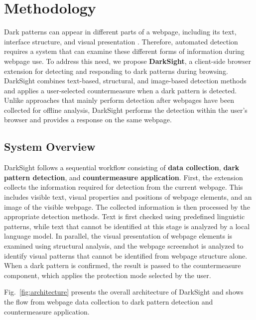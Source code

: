\documentclass[11pt,a4paper]{article}
\begin{document}
\setcounter{section}{2}
\section{Methodology}
\label{sec:methodology}

Dark patterns can appear in different parts of a webpage, including its text, interface structure, and visual presentation \cite{mathur2019, aidui2023, dpsentinel2024, gray2023}. Therefore, automated detection requires a system that can examine these different forms of information during webpage use. To address this need, we propose \textbf{DarkSight}, a client-side browser extension for detecting and responding to dark patterns during browsing. DarkSight combines text-based, structural, and image-based detection methods and applies a user-selected countermeasure when a dark pattern is detected. Unlike approaches that mainly perform detection after webpages have been collected for offline analysis, DarkSight performs the detection within the user's browser and provides a response on the same webpage.

\subsection{System Overview}
\label{subsec:system_overview}

DarkSight follows a sequential workflow consisting of \textbf{data collection}, \textbf{dark pattern detection}, and \textbf{countermeasure application}. First, the extension collects the information required for detection from the current webpage. This includes visible text, visual properties and positions of webpage elements, and an image of the visible webpage. The collected information is then processed by the appropriate detection methods. Text is first checked using predefined linguistic patterns, while text that cannot be identified at this stage is analyzed by a local language model. In parallel, the visual presentation of webpage elements is examined using structural analysis, and the webpage screenshot is analyzed to identify visual patterns that cannot be identified from webpage structure alone. When a dark pattern is confirmed, the result is passed to the countermeasure component, which applies the protection mode selected by the user.

Fig.~\ref{fig:architecture} presents the overall architecture of DarkSight and shows the flow from webpage data collection to dark pattern detection and countermeasure application.
\end{document}

